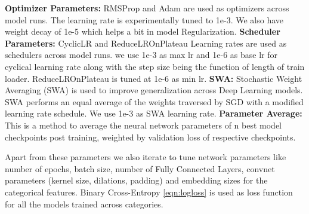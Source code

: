 {\bf Optimizer Parameters:} RMSProp \cite{bengio2015rmsprop} and Adam are used as optimizers across model runs. 
The learning rate is experimentally tuned to 1e-3. We also have weight decay of 1e-5 which helps a bit in model Regularization.
{\bf Scheduler Parameters:} CyclicLR \cite{smith2017cyclical} and ReduceLROnPlateau \cite{zaheer2018adaptive} 
Learning rates are used as schedulers across model runs.
we use 1e-3 as max lr and 1e-6 as base lr for cyclical learning rate along with the step size being the function of
length of train loader. ReduceLROnPlateau is tuned at 1e-6 as min lr.
{\bf SWA:} Stochastic Weight Averaging (SWA) \cite{izmailov2018averaging} is used to improve generalization 
across Deep Learning models. SWA performs an equal average of the weights traversed by SGD with a modified 
learning rate schedule. We use 1e-3 as SWA learning rate.
{\bf Parameter Average:} This is a method to average the neural network parameters of n best model checkpoints 
post training, weighted by validation loss of respective checkpoints.

Apart from these parameters we also iterate to tune network parameters like number of epochs, batch size, 
number of Fully Connected Layers, convnet parameters (kernel size, dilations, padding)
and embedding sizes for the categorical features. Binary Cross-Entropy \ref{eqn:logloss} is used as loss 
function for all the models trained across categories.

